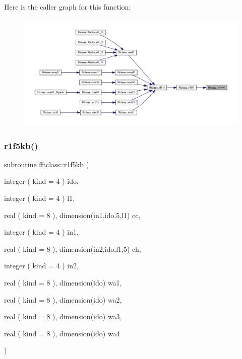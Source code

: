 Here is the caller graph for this function\+:\nopagebreak
\begin{figure}[H]
\begin{center}
\leavevmode
\includegraphics[width=350pt]{namespacefftclass_ac2e28efef69b7ac5c599c51dc9be973d_icgraph}
\end{center}
\end{figure}
\mbox{\label{namespacefftclass_a42f5de07f4eb994cbe15a8526291566b}} 
\subsubsection{\texorpdfstring{r1f5kb()}{r1f5kb()}}
{\footnotesize\ttfamily subroutine fftclass\+::r1f5kb (\begin{DoxyParamCaption}\item[{integer ( kind = 4 )}]{ido,  }\item[{integer ( kind = 4 )}]{l1,  }\item[{real ( kind = 8 ), dimension(in1,ido,5,l1)}]{cc,  }\item[{integer ( kind = 4 )}]{in1,  }\item[{real ( kind = 8 ), dimension(in2,ido,l1,5)}]{ch,  }\item[{integer ( kind = 4 )}]{in2,  }\item[{real ( kind = 8 ), dimension(ido)}]{wa1,  }\item[{real ( kind = 8 ), dimension(ido)}]{wa2,  }\item[{real ( kind = 8 ), dimension(ido)}]{wa3,  }\item[{real ( kind = 8 ), dimension(ido)}]{wa4 }\end{DoxyParamCaption})}

